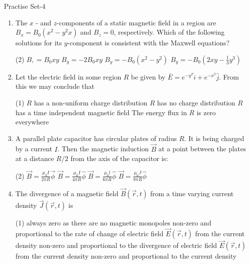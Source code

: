 \newpage
\begin{abox}
	Practise Set-4
\end{abox}
\begin{enumerate}
	\item 	The $x$ - and $z$-components of a static magnetic field in a region are $B_{x}=B_{0}\left(x^{2}-y^{2} x\right)$ and $B_{z}=0$, respectively. Which of the following solutions for its $y$-component is consistent with the Maxwell equations?
	 \begin{tasks}(2)
		\task[\textbf{a.}]$B,=B_{0} x y$
		\task[\textbf{b.}]$B_{y}=-2 B_{0} x y$
		\task[\textbf{c.}]$B_{y}=-B_{0}\left(x^{2}-y^{2}\right)$
		\task[\textbf{d.}] $B_{y}=-B_{0}\left(2 x y-\frac{1}{3} y^{3}\right)$
	\end{tasks}
\item 	Let the electric field in some region $R$ be given by $\bar{E}=e^{-y^{2}} \hat{i}+e^{-x^{2}} \hat{j}$. From this we may conclude that
	 \begin{tasks}(1)
		\task[\textbf{a.}]$R$ has a non-uniform charge distribution
		\task[\textbf{b.}] $R$ has no charge distribution
		\task[\textbf{c.}]$R$ has a time independent magnetic field
		\task[\textbf{d.}]  The energy flux in $R$ is zero everywhere
	\end{tasks}
\item A parallel plate capacitor has circular plates of radius $R$. It is being charged by a current $I$. Then the magnetic induction $\vec{B}$ at a point between the plates at a distance $R / 2$ from the axis of the capacitor is:
	 \begin{tasks}(2)
		\task[\textbf{a.}]$\vec{B}=\frac{\mu_{0} I}{2 \pi R} \vec{\phi}$
		\task[\textbf{b.}]$\vec{B}=\frac{\mu_{0} I}{4 \pi R} \hat{\phi}$
		\task[\textbf{c.}]$\vec{B}=\frac{\mu_{0} l}{6 \pi R} \hat{\phi}$
		\task[\textbf{d.}]  $\vec{B}=\frac{\mu_{0} J}{8 \pi R} \hat{\phi}$	
	\end{tasks}
\item 	The divergence of a magnetic field $\vec{B}(\vec{r}, t)$ from a time varying current density $\vec{J}(\vec{r}, t)$ is
	 \begin{tasks}(1)
		\task[\textbf{a.}]always zero as there are no magnetic monopoles
		\task[\textbf{b.}] non-zero and proportional to the rate of change of electric field $\vec{E}(\vec{r}, t)$ from the current density
		\task[\textbf{c.}]non-zero and proportional to the divergence of electric field $\vec{E}(\vec{r}, t)$ from the current density
		\task[\textbf{d.}]  non-zero and proportional to the current density

\end{tasks}
\end{enumerate}
